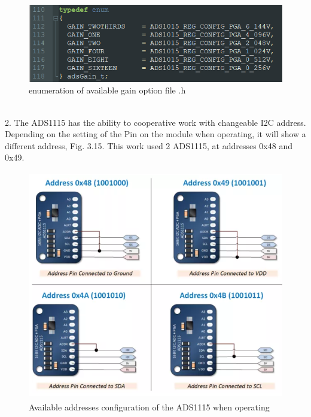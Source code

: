 \documentclass[12 pt, a4paper]{thesis}
\begin{document}
\begin{figure}[hbt!]
\centering
\includegraphics[width=140mm]{ADS1115_4.png}
\caption{enumeration of available gain option file .h}
\end{figure}
\\
2. The ADS1115 has the ability to cooperative work with changeable I2C address. Depending on the setting of the Pin on the module when operating, it will show a different address, Fig. 3.15. This work used 2 ADS1115, at addresses 0x48 and 0x49. 
\begin{figure}
\centering
\includegraphics[height = 100mm]{ADS1115_2.png}
\caption{Available addresses configuration of the ADS1115 when operating}
\end{figure}
\pagebreak
\end{document}
